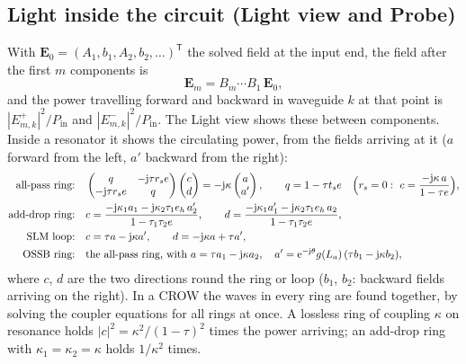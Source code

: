 \documentclass[10pt,a4paper]{article}
\newcommand{\jj}{\mathrm{j}}
\newcommand{\e}{\mathrm{e}}
\newcommand{\T}{\mathsf{T}}
\begin{document}
\subsection{Light inside the circuit (Light view and Probe)}
With $\mathbf{E}_0 = (A_1, b_1, A_2, b_2, \dots)^{\T}$ the solved field at the input end, the field after the first $m$ components is
\[
  \mathbf{E}_m = B_m \cdots B_1\,\mathbf{E}_0 ,
\]
and the power travelling forward and backward in waveguide $k$ at that point is $|E_{m,k}^{+}|^2/P_{\text{in}}$ and
$|E_{m,k}^{-}|^2/P_{\text{in}}$. The Light view shows these between components. Inside a resonator it shows the circulating power,
from the fields arriving at it ($a$ forward from the left, $a'$ backward from the right):
\begin{align*}
  \text{all-pass ring:}&\quad
  \begin{pmatrix} q & -\jj\tau r_s e\\ -\jj\tau r_s e & q\end{pmatrix}
  \begin{pmatrix} c\\ d\end{pmatrix} = -\jj\kappa\begin{pmatrix} a\\ a'\end{pmatrix},\qquad q = 1-\tau t_s e
  \quad\Bigl(r_s=0:\ c = \frac{-\jj\kappa\,a}{1-\tau e}\Bigr),\\
  \text{add-drop ring:}&\quad c = \frac{-\jj\kappa_1 a_1 - \jj\kappa_2\tau_1 e_h\,a_2'}{1-\tau_1\tau_2 e},\qquad
  d = \frac{-\jj\kappa_1 a_1' - \jj\kappa_2\tau_1 e_h\,a_2}{1-\tau_1\tau_2 e},\\
  \text{SLM loop:}&\quad c = \tau a - \jj\kappa a',\qquad d = -\jj\kappa a + \tau a' ,\\
  \text{OSSB ring:}&\quad \text{the all-pass ring, with } a = \tau a_1 - \jj\kappa a_2,\quad
  a' = \e^{-\jj\theta} g(L_a)\,(\tau b_1 - \jj\kappa b_2),
\end{align*}
where $c$, $d$ are the two directions round the ring or loop ($b_1$, $b_2$: backward fields arriving on the right). In a CROW
the waves in every ring are found together, by solving the coupler equations for all rings at once. A lossless ring of coupling $\kappa$ on resonance holds
$|c|^2 = \kappa^2/(1-\tau)^2$ times the power arriving; an add-drop ring with $\kappa_1=\kappa_2=\kappa$ holds $1/\kappa^2$ times.

\clearpage
\end{document}
